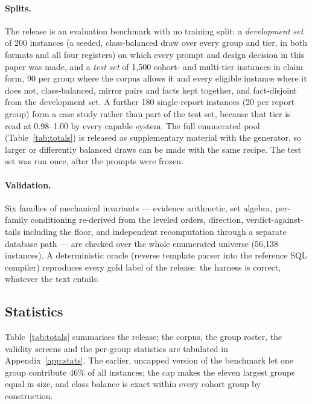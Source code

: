 \paragraph{Splits.} The release is an evaluation benchmark with no training
split: a \emph{development set} of 200 instances (a seeded, class-balanced
draw over every group and tier, in both formats and all four registers) on
which every prompt and design decision in this paper was made, and a
\emph{test set} of 1{,}500 cohort- and multi-tier instances in claim form,
90 per group where the corpus allows it and every eligible instance where it
does not, class-balanced, mirror pairs and facts kept together, and
fact-disjoint from the development set. A further 180 single-report instances
(20 per report group) form a case study rather than part of the test set,
because that tier is read at 0.98--1.00 by every capable system. The full
enumerated pool (Table~\ref{tab:totals}) is released as supplementary
material with the generator, so larger or differently balanced draws can be
made with the same recipe. The test set was run once, after the prompts were
frozen.

\paragraph{Validation.} Six families of mechanical invariants --- evidence
arithmetic, set algebra, per-family conditioning re-derived from the leveled
orders, direction, verdict-against-tails including the floor, and independent
recomputation through a separate database path --- are checked over the whole
enumerated universe (56{,}138 instances). A deterministic oracle (reverse
template parser into the reference SQL compiler) reproduces every gold label of
the release: the harness is correct, whatever the text entails.

\subsection{Statistics}
\label{sec:stats}

Table~\ref{tab:totals} summarises the release; the corpus, the group roster, the validity screens and the per-group statistics are tabulated in Appendix~\ref{app:stats}. The
earlier, uncapped version of the benchmark let one group contribute 46\% of all
instances; the cap makes the eleven largest groups equal in size, and
class balance is exact within every cohort group by construction.

